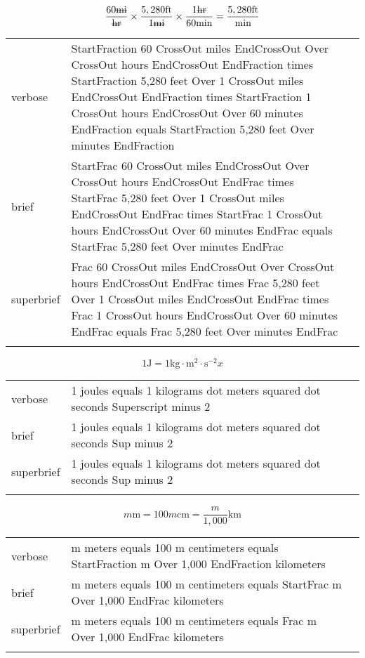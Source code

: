 
\label{sec:units}

\R
\E \[\frac{60\sout{mi}}{\sout{hr}}\times\frac{5,280 \text{ft}}{1\sout{mi}}\times\frac{1\sout{hr}}{60\text{min}}=\frac{5,280\text{ft}}{\text{min}}\]

\begin{longtable}[c]{@{}lll@{}}
\toprule\addlinespace
verbose & StartFraction 60 CrossOut miles EndCrossOut Over CrossOut
hours EndCrossOut EndFraction times StartFraction 5,280 feet Over 1
CrossOut miles EndCrossOut EndFraction times StartFraction 1 CrossOut
hours EndCrossOut Over 60 minutes EndFraction equals StartFraction 5,280
feet Over minutes EndFraction &

\\\addlinespace
brief & StartFrac 60 CrossOut miles EndCrossOut Over CrossOut hours
EndCrossOut EndFrac times StartFrac 5,280 feet Over 1 CrossOut miles
EndCrossOut EndFrac times StartFrac 1 CrossOut hours EndCrossOut Over 60
minutes EndFrac equals StartFrac 5,280 feet Over minutes EndFrac &

\\\addlinespace
superbrief & Frac 60 CrossOut miles EndCrossOut Over CrossOut hours
EndCrossOut EndFrac times Frac 5,280 feet Over 1 CrossOut miles
EndCrossOut EndFrac times Frac 1 CrossOut hours EndCrossOut Over 60
minutes EndFrac equals Frac 5,280 feet Over minutes EndFrac &

\\\addlinespace
\bottomrule
\end{longtable}



\E \[1\text{J}=1\text{kg}\cdot\text{m}^2\cdot\text{s}^{-2}x\]
\begin{longtable}[c]{@{}lll@{}}
\toprule\addlinespace
verbose & 1 joules equals 1 kilograms dot meters squared dot seconds
Superscript minus 2 &

\\\addlinespace
brief & 1 joules equals 1 kilograms dot meters squared dot seconds Sup
minus 2 &

\\\addlinespace
superbrief & 1 joules equals 1 kilograms dot meters squared dot seconds
Sup minus 2 &

\\\addlinespace
\bottomrule
\end{longtable}


\E \[m\text{m} = 100m\text{cm}=\frac{m}{1,000}\text{km}\]
\begin{longtable}[c]{@{}lll@{}}
\toprule\addlinespace
verbose & m meters equals 100 m centimeters equals StartFraction m Over
1,000 EndFraction kilometers &

\\\addlinespace
brief & m meters equals 100 m centimeters equals StartFrac m Over 1,000
EndFrac kilometers &

\\\addlinespace
superbrief & m meters equals 100 m centimeters equals Frac m Over 1,000
EndFrac kilometers &

\\\addlinespace
\bottomrule
\end{longtable}


